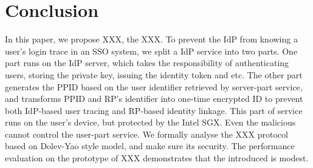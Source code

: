 \section{Conclusion}
In this paper, we propose XXX, the XXX. To prevent the IdP from knowing a user's login trace in an SSO system, we split a IdP service into two parts. One part runs on the IdP server, which takes the responsibility of authenticating users, storing the private key, issuing the identity token and etc. The other part generates the PPID based on the user identifier retrieved by server-part service, and transforms PPID and RP's identifier into one-time encrypted ID to prevent both IdP-based user tracing and RP-based identity linkage. This part of service runs on the user's device, but protected by the Intel SGX. Even the malicious cannot control the user-part service. 
We formally analyse the XXX protocol based on Dolev-Yao style model, and make sure its security. 
The performance evaluation on the prototype of XXX demonstrates that the introduced is modest. 